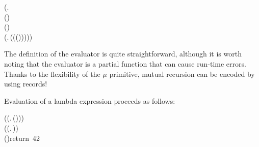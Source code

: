 \begin{hscode}
\>[9]{}(\lambda {}\mathbin{:}.\,\;\;\<[E]%
\\
\>[9]{}\<[11]%
\>[11]{}\;(\mathbin{:})\Rightarrow {}\;\<[E]%
\\
\>[9]{}\mid {}\;(\mathbin{:}\to {})\Rightarrow {}\<[E]%
\\
\>[9]{}\<[13]%
\>[13]{}\;(\lambda {}\mathbin{:}.\,(\;\;(\;(\;\;))))){}\<[E]%
\\
\>[3]{}\;\;\mathbin{:}\to {}\mathrel{=}\;\;\<[E]%
\ColumnHook
\end{hscode}\resethooks

The definition of the evaluator is quite straightforward, although it
is worth noting that the evaluator is a partial function that can
cause run-time errors. Thanks to the flexibility of the $\mu$
primitive, mutual recursion can be encoded by using records!

Evaluation of a lambda expression proceeds as follows:
\begin{hscode}\SaveRestoreHook
{}%
%
%
%
\>[3]{}\;\mathbin{:}\mathrel{=}\;{}\<[25]%
\>[25]{}(\;(\lambda {}\mathbin{:}.\,\;\;(\;)))\;{}\<[E]%
\\
\>[25]{}(\;(\lambda {}\mathbin{:}.\,)){}\<[E]%
\\
\>[3]{}\;\;(\;)\mbox{\onelinecomment  return 42}{}\<[E]%
\ColumnHook
\end{hscode}\resethooks
